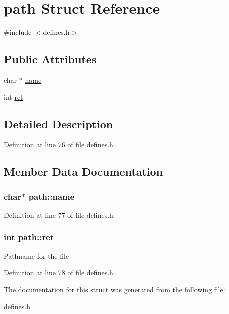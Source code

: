 \hypertarget{structpath}{\section{path Struct Reference}
\label{structpath}
}


{\ttfamily \#include $<$defines.\-h$>$}

\subsection*{Public Attributes}
\begin{DoxyCompactItemize}
\item 
char $\ast$ \hyperlink{structpath_a90b4e69e79ffcab58317188012e7da1f}{name}
\item 
int \hyperlink{structpath_a458da1607fd2ddce96c794a6876ddd6f}{ret}
\end{DoxyCompactItemize}


\subsection{Detailed Description}


Definition at line 76 of file defines.\-h.



\subsection{Member Data Documentation}
\hypertarget{structpath_a90b4e69e79ffcab58317188012e7da1f}{
\subsubsection[{name}]{\setlength{\rightskip}{0pt plus 5cm}char$\ast$ path\-::name}}\label{structpath_a90b4e69e79ffcab58317188012e7da1f}


Definition at line 77 of file defines.\-h.

\hypertarget{structpath_a458da1607fd2ddce96c794a6876ddd6f}{
\subsubsection[{ret}]{\setlength{\rightskip}{0pt plus 5cm}int path\-::ret}}\label{structpath_a458da1607fd2ddce96c794a6876ddd6f}
Pathname for the file 

Definition at line 78 of file defines.\-h.



The documentation for this struct was generated from the following file\-:\begin{DoxyCompactItemize}
\item 
\hyperlink{defines_8h}{defines.\-h}\end{DoxyCompactItemize}

